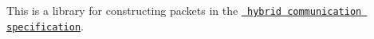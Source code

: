 This is a library for constructing packets in the \href{https://github.com/CarletonURocketry/hybrid-comm-format}{\texttt{ hybrid communication specification}}. 